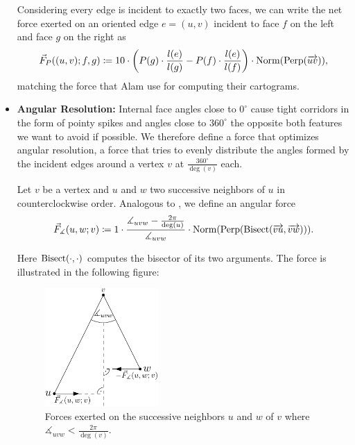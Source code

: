 \begin{itemize}
Considering every edge is incident to exactly two faces, we can write the net force exerted on an oriented edge $e = (u,v)$ incident to face $f$ on the left and face $g$ on the right as
%
\begin{equation*}
	\vec{F}_P((u,v);f,g) \coloneqq
	10 \cdot \left( P(g)\cdot\frac{l(e)}{l(g)} - P(f)\cdot\frac{l(e)}{l(f)} \right)
	\cdot \operatorname{Norm}(\operatorname{Perp}(\overrightarrow{uv}))
	,
\end{equation*}
%
matching the force that Alam \etal{} \cite{alam2013computing} use for computing their cartograms.


\item \textbf{Angular Resolution:} %
Internal face angles close to $0^\circ$ cause tight corridors in the form of pointy spikes and angles close to $360^\circ$ the opposite \emdash{} both features we want to avoid if possible.
We therefore define a force that optimizes angular resolution, \ie{} a force that tries to evenly distribute the angles formed by the incident edges around a vertex $v$ at $\frac{360^\circ}{\deg(v)}$ each.

Let $v$ be a vertex and $u$ and $w$ two successive neighbors of $u$ in counterclockwise order.
Analogous to \cite{argyriou2013maximizing}, we define an angular force
%
\begin{equation}
	\vec{F}_\measuredangle(u,w;v) \coloneqq
	1 \cdot \frac{\measuredangle_{uvw} - \frac{2 \pi}{\deg(u)}}{\measuredangle_{uvw}}
	\cdot \operatorname{Norm}(\operatorname{Perp}(\operatorname{Bisect}(\overrightarrow{vu}, \overrightarrow{vw})))
	.
\end{equation}

Here $\operatorname{Bisect}(\cdot,\cdot)$ computes the bisector of its two arguments.
The force is illustrated in the following figure:

\begin{figure}[H]
	\centering
	\includegraphics[height=45mm]{Resources/Drawing-Forces-AngularResolution.pdf}
	\caption{Forces exerted on the successive neighbors $u$ and $w$ of $v$ where $\measuredangle_{uvw} < \frac{2\pi}{\deg(v)}$.}
	\label{fig:drawing-forces-angular-resolution}
\end{figure}


\end{itemize}
